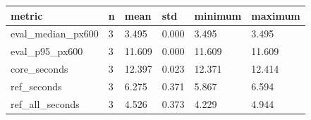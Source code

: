 \begin{tabular}{llllll}
\hline
metric & n & mean & std & minimum & maximum \\ \hline
eval\_median\_px600 & 3 & 3.495 & 0.000 & 3.495 & 3.495 \\
eval\_p95\_px600 & 3 & 11.609 & 0.000 & 11.609 & 11.609 \\
core\_seconds & 3 & 12.397 & 0.023 & 12.371 & 12.414 \\
ref\_seconds & 3 & 6.275 & 0.371 & 5.867 & 6.594 \\
ref\_all\_seconds & 3 & 4.526 & 0.373 & 4.229 & 4.944 \\
\hline
\end{tabular}
